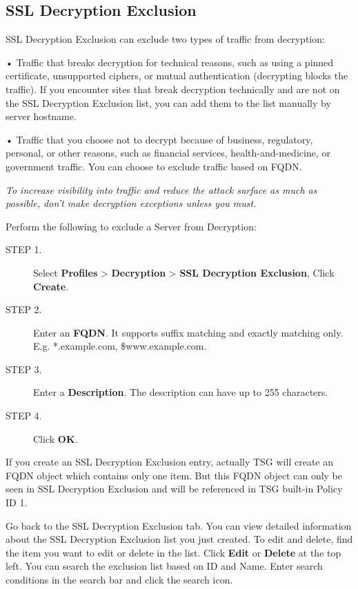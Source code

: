\subsection*{\hypertarget{link:SSL Decryption Exclusion}{SSL Decryption Exclusion}}
\label{sec:decrypt:certificate:exclusion}

SSL Decryption Exclusion can exclude two types of traffic from decryption:


• Traffic that breaks decryption for technical reasons, such as using a pinned certificate, unsupported ciphers, or mutual authentication (decrypting blocks the traffic). 
If you encounter sites that break decryption technically and are not on the SSL Decryption Exclusion list, you can add them to the list manually by server hostname.  


• Traffic that you choose not to decrypt because of business, regulatory, personal, or other reasons, such as financial services, health-and-medicine, 
or government traffic. You can choose to exclude traffic based on FQDN.


\notemark\textit{To increase visibility into traffic and reduce the attack surface as much as possible, don’t make decryption exceptions unless you must.}


Perform the following to exclude a Server from Decryption:

\begin{description}
    \item[STEP 1.]	Select \textbf{Profiles} > \textbf{Decryption} > \textbf{SSL Decryption Exclusion}, Click \textbf{Create}.
    \item[STEP 2.]	Enter an \textbf{FQDN}. It supports suffix matching and exactly matching only. E.g. *.example.com, \$www.example.com. 
    \item[STEP 3.]	Enter a \textbf{Description}. The description can have up to 255 characters.
    \item[STEP 4.]	Click \textbf{OK}.   
\end{description}

If you create an SSL Decryption Exclusion entry, actually TSG will create an FQDN object which contains only one item. 
But this FQDN object can only be seen in SSL Decryption Exclusion and will be referenced in TSG built-in Policy ID 1. 


Go back to the SSL Decryption Exclusion tab. You can view detailed information about the SSL Decryption Exclusion list you just created. 
To edit and delete, find the item you want to edit or delete in the list. Click \textbf{Edit} or \textbf{Delete} at the top left. 
You can search the exclusion list based on ID and Name. Enter search conditions in the search bar and click the search icon.

